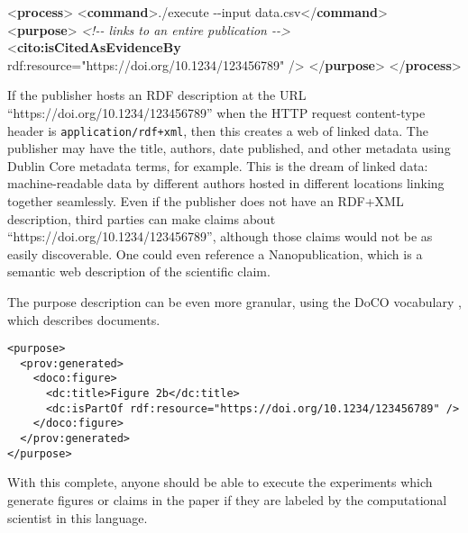 \documentclass[manuscript,authordraft]{acmart}
\newenvironment{Shaded}{}{}
\newcommand{\CommentTok}[1]{\textcolor[rgb]{0.38,0.63,0.69}{\textit{#1}}}
\newcommand{\KeywordTok}[1]{\textcolor[rgb]{0.00,0.44,0.13}{\textbf{#1}}}
\newcommand{\NormalTok}[1]{#1}
\newcommand{\OtherTok}[1]{\textcolor[rgb]{0.00,0.44,0.13}{#1}}
\newcommand{\StringTok}[1]{\textcolor[rgb]{0.25,0.44,0.63}{#1}}
\begin{document}
\begin{Shaded}
\begin{Highlighting}[]
\NormalTok{\textless{}}\KeywordTok{process}\NormalTok{\textgreater{}}
\NormalTok{  \textless{}}\KeywordTok{command}\NormalTok{\textgreater{}./execute {-}{-}input data.csv\textless{}/}\KeywordTok{command}\NormalTok{\textgreater{}}
\NormalTok{  \textless{}}\KeywordTok{purpose}\NormalTok{\textgreater{}}
    \CommentTok{\textless{}!{-}{-} links to an entire publication {-}{-}\textgreater{}}
\NormalTok{    \textless{}}\KeywordTok{cito:isCitedAsEvidenceBy}\OtherTok{ rdf:resource=}\StringTok{"https://doi.org/10.1234/123456789"}\NormalTok{ /\textgreater{}}
\NormalTok{  \textless{}/}\KeywordTok{purpose}\NormalTok{\textgreater{}}
\NormalTok{\textless{}/}\KeywordTok{process}\NormalTok{\textgreater{}}
\end{Highlighting}
\end{Shaded}

\normalsize

If the publisher hosts an RDF description at the URL
``https://doi.org/10.1234/123456789'' when the HTTP request content-type
header is \texttt{application/rdf+xml}, then this creates a web of
linked data. The publisher may have the title, authors, date published,
and other metadata using Dublin Core metadata terms, for example. This
is the dream of linked data: machine-readable data by different authors
hosted in different locations linking together seamlessly. Even if the
publisher does not have an RDF+XML description, third parties can make
claims about ``https://doi.org/10.1234/123456789'', although those
claims would not be as easily discoverable. One could even reference a
Nanopublication, which is a semantic web description of the scientific
claim.

The purpose description can be even more granular, using the DoCO
vocabulary \cite{constantin_document_2016}, which describes documents.

\small

\begin{verbatim}
<purpose>
  <prov:generated>
    <doco:figure>
      <dc:title>Figure 2b</dc:title>
      <dc:isPartOf rdf:resource="https://doi.org/10.1234/123456789" />
    </doco:figure>
  </prov:generated>
</purpose>
\end{verbatim}

\normalsize

With this complete, anyone should be able to execute the experiments
which generate figures or claims in the paper if they are labeled by the
computational scientist in this language.
\end{document}
